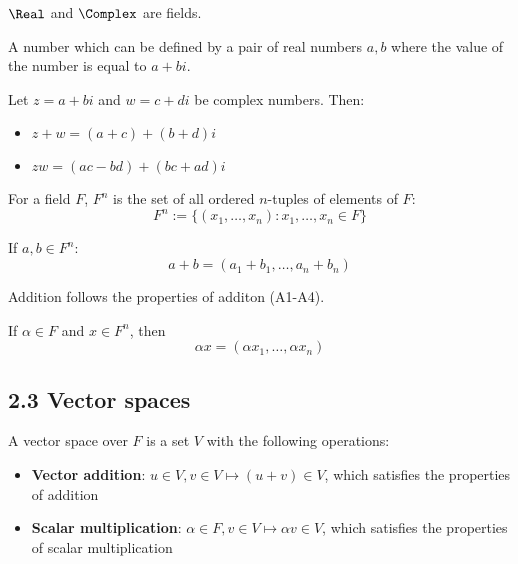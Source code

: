 \begin{theorem}
  $\Real$ and $\Complex$ are fields.
\end{theorem}

\begin{definition}
  A number which can be defined by a pair of real numbers $a, b$ where the value of the number is equal to $a + bi$.
\end{definition}

\begin{theorem}
  Let $z = a + bi$ and $w = c + di$ be complex numbers. Then:
  \begin{itemize}
    \item $z + w = (a + c) + (b + d)i$
    \item $zw = (ac - bd) + (bc + ad)i$
  \end{itemize}
\end{theorem}

\begin{definition}[$F^n$] For a field $F$, $F^n$ is the set of all ordered $n$-tuples of elements of $F$:
  \[
    F^n := \{ (x_1, \ldots, x_n) : x_1, \ldots, x_n \in F \}
  \]
\end{definition}

\begin{definition}[Addition in $F^n$] If $a, b \in F^n$:
  \[
    a + b = (a_1 + b_1, \ldots, a_n + b_n)
  \]

  Addition follows the properties of additon (A1-A4).
\end{definition}

\begin{definition} If $\alpha \in F$ and $x \in F^n$, then
  \[
    \alpha x = (\alpha x_1, \ldots, \alpha x_n)
  \]
\end{definition}

\subsection*{2.3 Vector spaces}

\begin{definition} A vector space over $F$ is a set $V$ with the following operations:
  \begin{itemize}
    \item \textbf{Vector addition}: $u \in V, v \in V \mapsto (u + v) \in V$, which satisfies the properties of addition
    \item \textbf{Scalar multiplication}: $\alpha \in F, v \in V \mapsto \alpha v \in V$, which satisfies the properties of scalar multiplication
  \end{itemize}
\end{definition}

